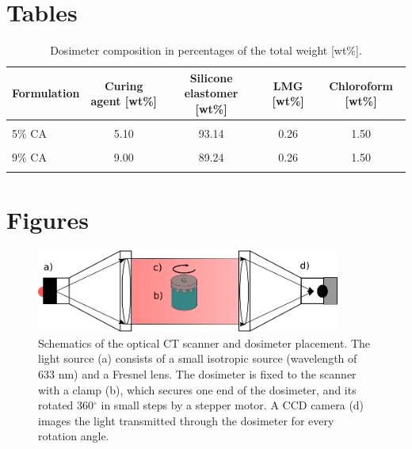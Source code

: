 \documentclass[12pt,twoside]{article}   %
\newcommand{\captionv}[3]{\begin{center}\parbox{#1cm}{\caption[#2]{{\sf #3}}}
        \end{center}}
\begin{document}
\section{Tables}
\begin{table}[htbp]
\begin{center}
\captionv{10}{Dosimeter compositions}{Dosimeter composition in percentages of the total weight [wt\%].
\label{table1}
\vspace*{2ex}
}
\begin{tabular} {|l|c|c|c|c|}
\hline

Formulation & Curing agent [wt\%]   & Silicone elastomer [wt\%] & LMG        [wt\%] & Chloroform [wt\%] \\
\hline
        &               &               &               &        \\
5\% CA      & 5.10           & 93.14         &  0.26         & 1.50 \\
&&&&  \vspace{-2mm}\\
9\% CA      & 9.00          & 89.24          &  0.26          & 1.50 \\
        &               &               &               &        \\
\hline
\end{tabular}
\end{center}
\end{table}



\clearpage
\section{Figures}

\begin{figure}[ht]
   \begin{center}
   \includegraphics[width=10cm]{optical_ct.eps}
   \captionv{12}{Short title - optical CT scanner schematics}
   {Schematics of the optical CT scanner and dosimeter placement. The light 	source (a) consists of a small isotropic source (wavelength of 633 nm) 		and a Fresnel lens. The dosimeter is fixed to the scanner with a clamp 	(b), which secures one end of the dosimeter, and its rotated 360${}^{\circ}$ in small steps by a stepper motor. A CCD camera (d) images the light transmitted through the dosimeter for every rotation angle.
   \label{fig_example} 
    }  %
    \end{center}
\end{figure}
\end{document}
